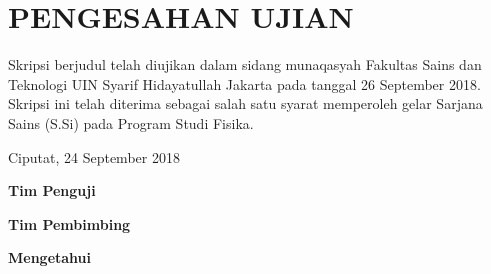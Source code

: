 \chapter{PENGESAHAN UJIAN}
Skripsi berjudul \judul{} telah diujikan dalam sidang munaqasyah Fakultas Sains dan Teknologi UIN Syarif Hidayatullah Jakarta pada tanggal 26 September 2018. Skripsi ini telah diterima sebagai salah satu syarat memperoleh gelar Sarjana Sains (S.Si) pada Program Studi Fisika.

\begin{flushright}
    Ciputat, 24 September 2018
\end{flushright}

\centerline{\textbf{Tim Penguji}}


\centerline{\textbf{Tim Pembimbing}}


\centerline{\textbf{Mengetahui}}

